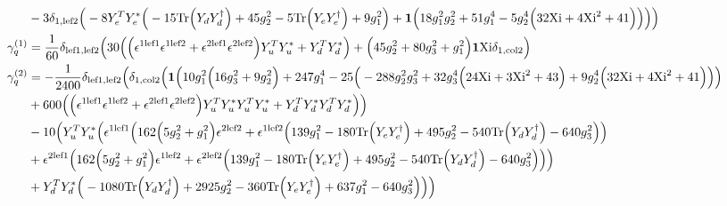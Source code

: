 {\begin{align}
 &-3 \delta_{1,\text{lef2}} \Big(-8 {Y_{e}^{T}  Y_e^*} \Big(-15 \mbox{Tr}\Big({Y_d  Y_{d}^{\dagger}}\Big)  + 45 g_{2}^{2}  -5 \mbox{Tr}\Big({Y_e  Y_{e}^{\dagger}}\Big)  + 9 g_{1}^{2} \Big) + {\bf 1} \Big(18 g_{1}^{2} g_{2}^{2}  + 51 g_{1}^{4}  -5 g_{2}^{4} \Big(32 \text{Xi}  + 4 \text{Xi}^{2}  + 41\Big)\Big)\Big)\Big)\\ 
\gamma_{q}^{(1)} & =  
\frac{1}{60} \delta_{\text{lef1},\text{lef2}} \Big(30 \Big(\Big(\epsilon^{{1 \text{lef1}}} \epsilon^{{1 \text{lef2}}}  + \epsilon^{{2 \text{lef1}}} \epsilon^{{2 \text{lef2}}} \Big){Y_{u}^{T}  Y_u^*}  + {Y_{d}^{T}  Y_d^*}\Big) + \Big(45 g_{2}^{2}  + 80 g_{3}^{2}  + g_{1}^{2}\Big){\bf 1} \text{Xi} \delta_{1,\text{col2}} \Big)\\ 
\gamma_{q}^{(2)} & =  
-\frac{1}{2400} \delta_{\text{lef1},\text{lef2}} \Big(\delta_{1,\text{col2}} \Big({\bf 1} \Big(10 g_{1}^{2} \Big(16 g_{3}^{2}  + 9 g_{2}^{2} \Big) + 247 g_{1}^{4}  -25 \Big(-288 g_{2}^{2} g_{3}^{2}  + 32 g_{3}^{4} \Big(24 \text{Xi}  + 3 \text{Xi}^{2}  + 43\Big) + 9 g_{2}^{4} \Big(32 \text{Xi}  + 4 \text{Xi}^{2}  + 41\Big)\Big)\Big)\nonumber \\ 
 &+600 \Big(\Big(\epsilon^{{1 \text{lef1}}} \epsilon^{{1 \text{lef2}}}  + \epsilon^{{2 \text{lef1}}} \epsilon^{{2 \text{lef2}}} \Big){Y_{u}^{T}  Y_u^*  Y_{u}^{T}  Y_u^*}  + {Y_{d}^{T}  Y_d^*  Y_{d}^{T}  Y_d^*}\Big)\Big)\nonumber \\ 
 &-10 \Big({Y_{u}^{T}  Y_u^*} \Big(\epsilon^{{1 \text{lef1}}} \Big(162 \Big(5 g_{2}^{2}  + g_{1}^{2}\Big)\epsilon^{{2 \text{lef2}}}  + \epsilon^{{1 \text{lef2}}} \Big(139 g_{1}^{2}  -180 \mbox{Tr}\Big({Y_e  Y_{e}^{\dagger}}\Big)  + 495 g_{2}^{2}  -540 \mbox{Tr}\Big({Y_d  Y_{d}^{\dagger}}\Big)  -640 g_{3}^{2} \Big)\Big)\nonumber \\ 
 &+\epsilon^{{2 \text{lef1}}} \Big(162 \Big(5 g_{2}^{2}  + g_{1}^{2}\Big)\epsilon^{{1 \text{lef2}}}  + \epsilon^{{2 \text{lef2}}} \Big(139 g_{1}^{2}  -180 \mbox{Tr}\Big({Y_e  Y_{e}^{\dagger}}\Big)  + 495 g_{2}^{2}  -540 \mbox{Tr}\Big({Y_d  Y_{d}^{\dagger}}\Big)  -640 g_{3}^{2} \Big)\Big)\Big)\nonumber \\ 
 &+{Y_{d}^{T}  Y_d^*} \Big(-1080 \mbox{Tr}\Big({Y_d  Y_{d}^{\dagger}}\Big)  + 2925 g_{2}^{2}  -360 \mbox{Tr}\Big({Y_e  Y_{e}^{\dagger}}\Big)  + 637 g_{1}^{2}  -640 g_{3}^{2} \Big)\Big)\Big)
\end{align} } 
